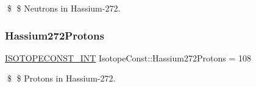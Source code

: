 \$ \$ Neutrons in Hassium-\/272. \mbox{\label{group___isotope_const-_hassium-_hs272_gaa7e81494bd32bb1a8417e7d43c7e65c9}} 
\subsubsection{\texorpdfstring{Hassium272\+Protons}{Hassium272Protons}}
{\footnotesize\ttfamily \mbox{\hyperlink{group___isotope_const-_macros_ga5f18360b3e99483a35c32d789e62621c}{I\+S\+O\+T\+O\+P\+E\+C\+O\+N\+S\+T\+\_\+\+I\+NT}} Isotope\+Const\+::\+Hassium272\+Protons = 108}

\$ \$ Protons in Hassium-\/272. 